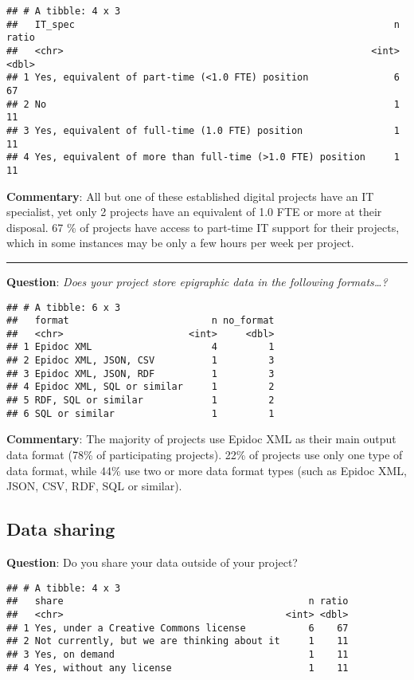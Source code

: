 \documentclass[
]{article}
\begin{document}
\begin{verbatim}
## # A tibble: 4 x 3
##   IT_spec                                                        n ratio
##   <chr>                                                      <int> <dbl>
## 1 Yes, equivalent of part-time (<1.0 FTE) position               6    67
## 2 No                                                             1    11
## 3 Yes, equivalent of full-time (1.0 FTE) position                1    11
## 4 Yes, equivalent of more than full-time (>1.0 FTE) position     1    11
\end{verbatim}

\textbf{Commentary}: All but one of these established digital projects
have an IT specialist, yet only 2 projects have an equivalent of 1.0 FTE
or more at their disposal. 67 \% of projects have access to part-time IT
support for their projects, which in some instances may be only a few
hours per week per project.

\begin{center}\rule{0.5\linewidth}{0.5pt}\end{center}

\textbf{Question}: \emph{Does your project store epigraphic data in the
following formats\ldots?}

\begin{verbatim}
## # A tibble: 6 x 3
##   format                         n no_format
##   <chr>                      <int>     <dbl>
## 1 Epidoc XML                     4         1
## 2 Epidoc XML, JSON, CSV          1         3
## 3 Epidoc XML, JSON, RDF          1         3
## 4 Epidoc XML, SQL or similar     1         2
## 5 RDF, SQL or similar            1         2
## 6 SQL or similar                 1         1
\end{verbatim}

\textbf{Commentary}: The majority of projects use Epidoc XML as their
main output data format (78\% of participating projects). 22\% of
projects use only one type of data format, while 44\% use two or more
data format types (such as Epidoc XML, JSON, CSV, RDF, SQL or similar).

\hypertarget{data-sharing}{%
\subsection{Data sharing}\label{data-sharing}}

\textbf{Question}: Do you share your data outside of your project?

\begin{verbatim}
## # A tibble: 4 x 3
##   share                                           n ratio
##   <chr>                                       <int> <dbl>
## 1 Yes, under a Creative Commons license           6    67
## 2 Not currently, but we are thinking about it     1    11
## 3 Yes, on demand                                  1    11
## 4 Yes, without any license                        1    11
\end{verbatim}
\end{document}
